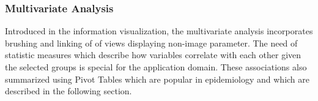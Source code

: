 \documentclass[journal]{style/vgtc} 			          %
\begin{document}
\subsubsection{Multivariate Analysis}
Introduced in the information visualization, the multivariate analysis incorporates brushing and linking of of views displaying non-image parameter.
%
%
The need of statistic measures which describe how variables correlate with each other given the selected groups is special for the application domain.
%
These associations also summarized using Pivot Tables which are popular in epidemiology and which are described in the following section.
\end{document}

